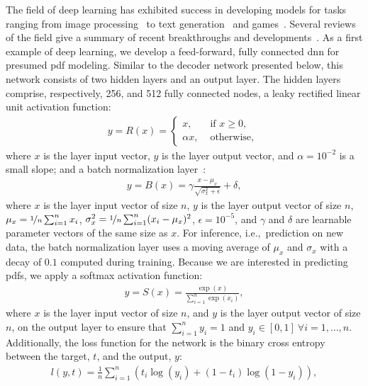 \documentclass[review]{elsarticle}
\begin{document}
The field of deep learning has exhibited success in developing models
for tasks ranging from image
processing~\cite{Goodfellow2014,Burger2012,Dosovitskiy2015,Lefkimmiatis2016,Ledig2017,Tai2017,Lai2017}
to text generation~\cite{Graves2013,Wu2016,Kwon2017} and
games~\cite{Silver2017}. Several reviews of the field give a summary
of recent breakthroughs and developments~\cite{Lecun2015,
  Schmidhuber2015, Prieto2016, Goodfellow2016, Liu2017}. As a first
example of deep learning, we develop a feed-forward, fully connected
\gls{dnn} for presumed \gls{pdf} modeling. Similar to the decoder
network presented below, this network consists of two hidden layers
and an output layer. The hidden layers comprise,
respectively, 256, and 512 fully connected nodes, a leaky rectified
linear unit activation function:
\begin{align}
  \label{eq:relu}
  y = R(x) =
  \begin{cases}
    x, & \text{ if } x \geq 0, \\
    \alpha x, & \text{ otherwise, }
  \end{cases}
\end{align}
where $x$ is the layer input vector, $y$ is the layer output vector,
and $\alpha=10^{-2}$ is a small slope; and a batch normalization
layer~\cite{Ioffe2015}:
\begin{align}
  \label{eq:bn}
  y = B(x) = \gamma \frac{x - \mu_x}{\sqrt{\sigma_x^2 + \epsilon}} + \delta,
\end{align}
where $x$ is the layer input vector of size $n$, $y$ is the layer
output vector of size $n$, $\mu_x = \nicefrac{1}{n} \sum_{i=1}^n x_i$,
$\sigma_x^2 = \nicefrac{1}{n} \sum_{i=1}^n (x_i - \mu_x)^2$,
$\epsilon = 10^{-5}$, and $\gamma$ and $\delta$ are learnable
parameter vectors of the same size as $x$. For inference, i.e.,\
prediction on new data, the batch normalization layer uses a moving
average of $\mu_x$ and $\sigma_x$ with a decay of $0.1$ computed
during training. Because we are interested in predicting \glspl{pdf}, we apply a softmax activation function:
\begin{align}
  y = S(x) = \frac{\exp{(x)}}{\sum^n_{i=1} \exp{(x_i)}},
\end{align}
where $x$ is the layer input vector of size $n$, and $y$ is the layer
output vector of size $n$, on the output layer to ensure
that $\sum^n_{i=1} y_i = 1$ and
$y_i \in [0,1]~\forall i = 1, \dots, n$. Additionally, the loss
function for the network is the binary cross entropy between the
target, $t$, and the output, $y$:
\begin{align}
  l(y,t) = \frac{1}{n} \sum_{i=1}^n{\left( t_i \log{(y_i)}+(1-t_i) \log(1-y_i) \right)},
\end{align}
\end{document}
